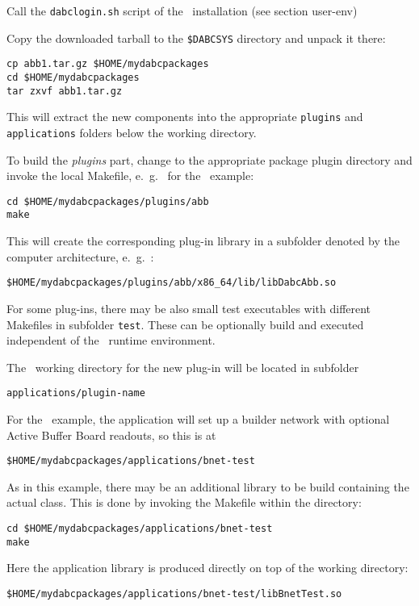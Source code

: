 \item Call the {\tt dabclogin.sh} script of the \dabc\ installation (see section user-env)

\item Copy the downloaded tarball to the {\tt \$DABCSYS} directory and unpack it there:
\begin{verbatim}
cp abb1.tar.gz $HOME/mydabcpackages
cd $HOME/mydabcpackages
tar zxvf abb1.tar.gz
\end{verbatim} 
This will extract the new components into the appropriate {\tt plugins} and
{\tt applications} folders below the working directory. 

\item To build the {\em plugins} part, change to the appropriate package plugin
directory and invoke the local Makefile, e.~g.~ for the \ABB\ example:

\begin{verbatim}
cd $HOME/mydabcpackages/plugins/abb
make
\end{verbatim} 
This will create the corresponding plug-in library in a subfolder denoted by the
computer architecture, e.~g.~:
\begin{verbatim}
$HOME/mydabcpackages/plugins/abb/x86_64/lib/libDabcAbb.so
\end{verbatim} 


\item For some plug-ins, there may be also small test executables with different Makefiles in subfolder {\tt test}. These can be optionally build and executed independent of the
\dabc\ runtime environment.

\item The \dabc\ working directory for the new plug-in will be located in
subfolder 
\begin{verbatim}
applications/plugin-name 
\end{verbatim}
For the \ABB\ example, the application
will set up a builder network with optional Active Buffer Board readouts, so this
is at
\begin{verbatim}
$HOME/mydabcpackages/applications/bnet-test
\end{verbatim}
As in this example, there may be an additional library to be build containing the actual
 class. This is done by invoking the Makefile within the directory:
\begin{verbatim}
cd $HOME/mydabcpackages/applications/bnet-test
make
\end{verbatim}
Here the application library is produced directly on top of the working directory: 
\begin{verbatim}
$HOME/mydabcpackages/applications/bnet-test/libBnetTest.so
\end{verbatim}

